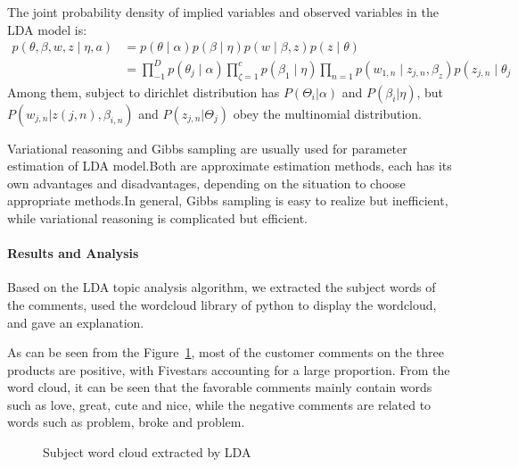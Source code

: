 \documentclass[../mcmpaper]{subfiles}
\begin{document}
    \par
    The joint probability density of implied variables and observed variables in the LDA model is:
    \begin{equation}
    \begin{aligned}
    p(\theta, \beta, w, z \mid \eta, a) &=p(\theta \mid \alpha) p(\beta \mid \eta) p(w \mid \beta, z) p(z \mid \theta) \\
    &=\prod_{-1}^{D} p\left(\theta_{j} \mid \alpha\right) \prod_{\zeta=1}^{c} p\left(\beta_{1} \mid \eta\right) \prod_{n=1} p\left(w_{1, n} \mid z_{j, n}, \beta_{z}\right) p\left(z_{j, n} \mid \theta_{j}\right.
    \end{aligned}
    \end{equation}
    Among them, subject to dirichlet distribution has $P(\Theta_i|\alpha)$ and $P(\beta_i|\eta)$, but $P(w_{j,n}|z(j, n), \beta_{i, n})$ and $P(z_{j,n}|\Theta_j)$ obey the multinomial distribution.
    \par
    Variational reasoning and Gibbs sampling are usually used for parameter estimation of LDA model.Both are approximate estimation methods, each has its own advantages and disadvantages, depending on the situation to choose appropriate methods.In general, Gibbs sampling is easy to realize but inefficient, while variational reasoning is complicated but efficient.
    \paragraph{Results and Analysis}
    Based on the LDA topic analysis algorithm, we extracted the subject words of the comments, used the wordcloud library of python to display the wordcloud, and gave an explanation.
    \par
    As can be seen from the Figure~\ref{fig:4.4.a}, most of the customer comments on the three products are positive, with Fivestars accounting for a large proportion. From the word cloud, it can be seen that the favorable comments mainly contain words such as love, great, cute and nice, while the negative comments are related to words such as problem, broke and problem.
    \begin{figure}[!ht]
    \centering
    \caption{Subject word cloud extracted by LDA}
    \label{fig:4.4.a}
    \end{figure}
   
\end{document}
